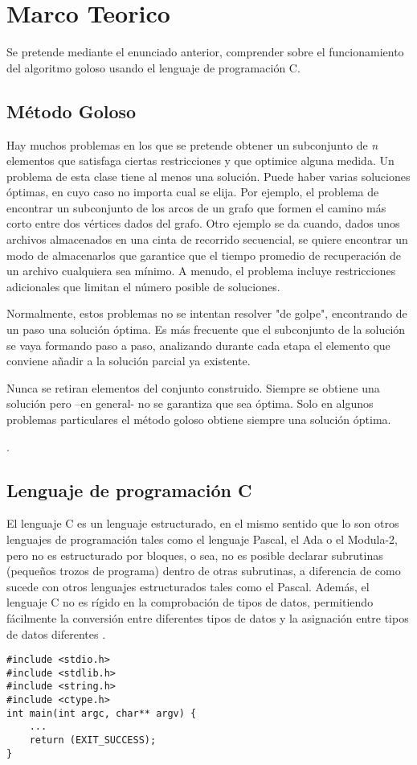 \documentclass[9pt,twocolumn,twoside]{optica}
\begin{document}
\section{Marco Teorico}
Se pretende mediante el enunciado anterior, comprender sobre el funcionamiento del algoritmo goloso usando el lenguaje de programación C.

\subsection{Método Goloso}

Hay muchos problemas en los que se pretende obtener un subconjunto de \textit{n} elementos que
satisfaga ciertas restricciones y que optimice alguna medida.  Un problema de esta clase tiene al
menos una solución.  Puede haber varias soluciones óptimas, en cuyo caso no importa cual se
elija.  Por ejemplo, el problema de encontrar un subconjunto de los arcos de un grafo que formen 
el camino más corto entre dos vértices dados del grafo.  Otro ejemplo se da cuando, dados unos
archivos almacenados en una cinta de recorrido secuencial, se quiere encontrar un modo de
almacenarlos que garantice que el tiempo promedio de recuperación de un archivo cualquiera sea 
mínimo.  A menudo, el problema incluye restricciones adicionales que limitan el número posible
de soluciones.

Normalmente, estos problemas no se intentan resolver "de golpe", encontrando de un paso una
solución óptima.  Es más frecuente que el subconjunto de la solución se vaya formando paso a
paso, analizando durante cada etapa el elemento que conviene añadir a la solución parcial ya
existente.  

Nunca se retiran elementos del conjunto construido. Siempre se obtiene una solución pero –en
general- no se garantiza que sea óptima. Solo en algunos problemas particulares el método goloso
obtiene siempre una solución óptima.


 \cite{algoritmo}.

\subsection{Lenguaje de programación C}
El lenguaje C es un lenguaje estructurado, en el mismo sentido que lo son otros
lenguajes de programación tales como el lenguaje Pascal, el Ada o el Modula-2, pero
no es estructurado por bloques, o sea, no es posible declarar subrutinas (pequeños
trozos de programa) dentro de otras subrutinas, a diferencia de como sucede con otros lenguajes estructurados tales como el Pascal. Además, el lenguaje C no es rígido en la comprobación de tipos de datos, permitiendo fácilmente la conversión entre diferentes tipos de datos y la asignación entre tipos de datos diferentes \cite{lenguajeC}.
\lstset{language=C, breaklines=true, basicstyle=\footnotesize}
\begin{lstlisting}[frame=single]
#include <stdio.h>
#include <stdlib.h>
#include <string.h>
#include <ctype.h>
int main(int argc, char** argv) {
    ...
    return (EXIT_SUCCESS); 
}
\end{lstlisting}
\end{document}
